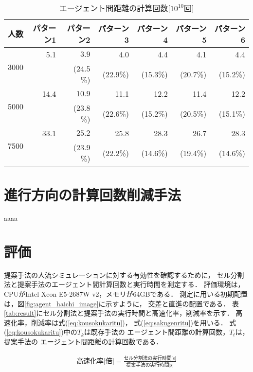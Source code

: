 \documentclass{maelab_y}
\begin{document}
\begin{table*}[t]
\begin{center}
\caption{エージェント間距離の計算回数[$10^{10}$回]}
\label{tb:count_result_yobi}
\begin{tabular}{c|r|r|r|r|r|r}
\hline \hline
	人数 & パターン1 & パターン2 & パターン3 & パターン4 & パターン5 & パターン6 \\  
	\hline
	\multirow{2}{*}{3000} 
	& 5.1   & $\mathbf{3.9}$   & 4.0    & 4.4    & 4.1    & 4.4   \\  
	&       & ($\mathbf{24.5}$\%) 					& (22.9\%) & (15.3\%) & (20.7\%) & (15.2\%) \\ \hline
	\multirow{2}{*}{5000} 
	& 14.4  &  $\mathbf{10.9}$  					  & 11.1   & 12.2   & 11.4   & 12.2  \\  
	&       & ($\mathbf{23.8}$\%) 					& (22.6\%) & (15.2\%) & (20.5\%) & (15.1\%) \\ \hline
	\multirow{2}{*}{7500} 
	& 33.1  & $\mathbf{25.2}$	 		    	 	 & 25.8   & 28.3   & 26.7   & 28.3  \\ 
	&       & ($\mathbf{23.9}$\%) 					& (22.2\%) & (14.6\%) & (19.4\%) & (14.6\%) \\ \hline
    \end{tabular}
  \end{center}
\end{table*}

\section{進行方向の計算回数削減手法}
aaaa

\section{評価}
提案手法の人流シミュレーションに対する有効性を確認するために，
セル分割法と提案手法のエージェント間計算回数と実行時間を測定する．
評価環境は，CPUがIntel Xeon E5-2687W v2，メモリが64GBである．
測定に用いる初期配置は，図\ref{fig:agent_haichi_image}に示すように，
交差と直進の配置である．
表\ref{tab:result}にセル分割法と提案手法の実行時間と高速化率，削減率を示す．
高速化率，削減率は式(\ref{eq:kousokukaritu})，
式(\ref{eq:sakugenritu})を用いる．
式(\ref{eq:kousokukaritu})中の$T_{k}$は既存手法の
エージェント間距離の計算回数，$T_{t}$は，提案手法の
エージェント間距離の計算回数である．

\begin{eqnarray}
  \label{eq:kousokukaritu}
  \mbox{高速化率[倍]} =
  \frac{\mbox{セル分割法の実行時間[s]}}{\mbox{提案手法の実行時間[s]}}
\end{eqnarray}
\end{document}
